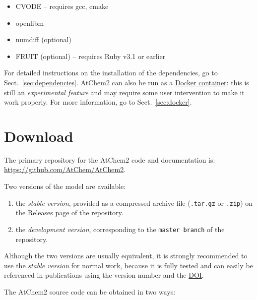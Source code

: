 \begin{itemize}
\item CVODE -- requires gcc, cmake %
\item openlibm
\item numdiff (optional)
\item FRUIT (optional) -- requires Ruby v3.1 or earlier
\end{itemize}

For detailed instructions on the installation of the dependencies, go to
Sect.~\ref{sec:dependencies}. AtChem2 can also be run as a \href{https://www.docker.com}{Docker
  container}: this is still an \emph{experimental feature} and may require some user
intervention to make it work properly. For more information, go to Sect.~\ref{sec:docker}.

\section{Download} \label{sec:download}

The primary repository for the AtChem2 code and documentation is:\\
\href{https://github.com/AtChem/AtChem2}{https://github.com/AtChem/AtChem2}.

Two versions of the model are available:

\begin{enumerate}
\item the \emph{stable version}, provided as a compressed archive file (\texttt{.tar.gz} or
  \texttt{.zip}) on the Releases page of the repository.
\item the \emph{development version}, corresponding to the \texttt{master\ branch} of the
  repository.
\end{enumerate}

Although the two versions are usually equivalent, it is strongly recommended to use the
\emph{stable version} for normal work, because it is fully tested and can easily be referenced
in publications using the version number and the
\href{https://www.doi.org/the-identifier/what-is-a-doi}{DOI}.

The AtChem2 source code can be obtained in two ways:

